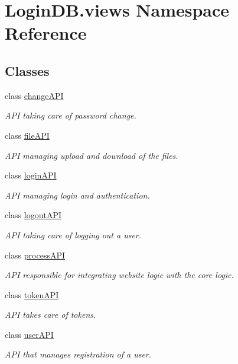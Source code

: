 \hypertarget{namespace_login_d_b_1_1views}{}\section{Login\+D\+B.\+views Namespace Reference}
\label{namespace_login_d_b_1_1views}
\subsection*{Classes}
\begin{DoxyCompactItemize}
\item 
class \hyperlink{class_login_d_b_1_1views_1_1change_a_p_i}{change\+A\+PI}
\begin{DoxyCompactList}\small\item\em A\+PI taking care of password change. \end{DoxyCompactList}\item 
class \hyperlink{class_login_d_b_1_1views_1_1file_a_p_i}{file\+A\+PI}
\begin{DoxyCompactList}\small\item\em A\+PI managing upload and download of the files. \end{DoxyCompactList}\item 
class \hyperlink{class_login_d_b_1_1views_1_1login_a_p_i}{login\+A\+PI}
\begin{DoxyCompactList}\small\item\em A\+PI managing login and authentication. \end{DoxyCompactList}\item 
class \hyperlink{class_login_d_b_1_1views_1_1logout_a_p_i}{logout\+A\+PI}
\begin{DoxyCompactList}\small\item\em A\+PI taking care of logging out a user. \end{DoxyCompactList}\item 
class \hyperlink{class_login_d_b_1_1views_1_1process_a_p_i}{process\+A\+PI}
\begin{DoxyCompactList}\small\item\em A\+PI responsible for integrating website logic with the core logic. \end{DoxyCompactList}\item 
class \hyperlink{class_login_d_b_1_1views_1_1token_a_p_i}{token\+A\+PI}
\begin{DoxyCompactList}\small\item\em A\+PI takes care of tokens. \end{DoxyCompactList}\item 
class \hyperlink{class_login_d_b_1_1views_1_1user_a_p_i}{user\+A\+PI}
\begin{DoxyCompactList}\small\item\em A\+PI that manages registration of a user. \end{DoxyCompactList}\end{DoxyCompactItemize}
